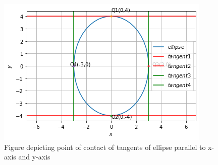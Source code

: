  \begin{figure}[h!]
	\centering
	\includegraphics[width=\columnwidth]{./solutions/conics/1/16/ellipse.png}
	\caption{Figure depicting point of contact of tangents of ellipse parallel to x-axis and y-axis}
	\label{eq:solutions/1/16/fig1}
\end{figure}
